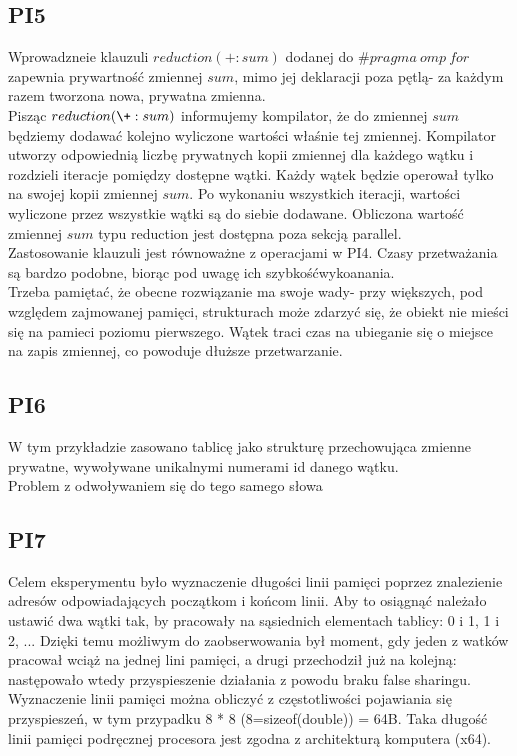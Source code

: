 \documentclass{article}
\begin{document}
\subsection{PI5}
Wprowadzneie klauzuli $reduction(+:sum)$ dodanej do $\#pragma\:omp\:for$ zapewnia prywartność zmiennej $sum$, mimo jej deklaracji poza pętlą- za każdym razem tworzona nowa, prywatna zmienna.\\
Pisząc $reduction(\+:sum)$ informujemy kompilator, że do zmiennej $sum$ będziemy dodawać kolejno wyliczone wartości właśnie tej zmiennej. Kompilator utworzy odpowiednią liczbę prywatnych kopii zmiennej dla każdego wątku i rozdzieli iteracje pomiędzy dostępne wątki. Każdy wątek będzie operował tylko na swojej kopii zmiennej $sum$. Po wykonaniu wszystkich iteracji, wartości wyliczone przez wszystkie wątki są do siebie dodawane. Obliczona wartość zmiennej $sum$ typu reduction jest dostępna poza sekcją parallel.\\
Zastosowanie klauzuli jest równoważne z operacjami w PI4. Czasy przetważania są bardzo podobne, biorąc pod uwagę ich szybkośćwykoanania.\\
Trzeba pamiętać, że obecne rozwiązanie ma swoje wady- przy większych, pod względem zajmowanej pamięci, strukturach może zdarzyć się, że obiekt nie mieści się na pamieci poziomu pierwszego. Wątek traci czas na ubieganie się o miejsce na zapis zmiennej, co powoduje dłuższe przetwarzanie. 
\subsection{PI6}
W tym przykładzie zasowano tablicę jako strukturę przechowująca zmienne prywatne, wywoływane unikalnymi numerami id danego wątku. \\
Problem z odwoływaniem się do tego samego słowa
\subsection{PI7}
Celem eksperymentu było wyznaczenie długości linii pamięci poprzez znalezienie adresów odpowiadających początkom i końcom linii. Aby to osiągnąć należało ustawić dwa wątki tak, by pracowały na sąsiednich elementach tablicy: 0 i 1, 1 i 2, ... Dzięki temu możliwym do zaobserwowania był moment, gdy jeden z watków pracował wciąż na jednej lini pamięci, a drugi przechodził już na kolejną: następowało wtedy przyspieszenie działania z powodu braku false sharingu. Wyznaczenie linii pamięci można obliczyć z częstotliwości pojawiania się przyspieszeń, w tym przypadku 8 * 8 (8=sizeof(double)) = 64B. Taka długość linii pamięci podręcznej procesora jest zgodna z architekturą komputera (x64). 
\end{document}
